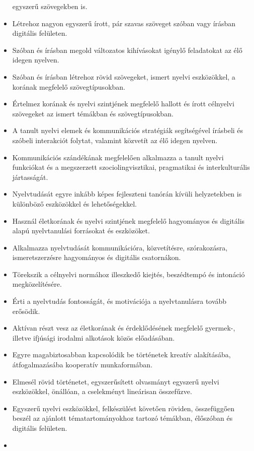 \begin{itemize}
  egyszerű szövegekben is.
\item
  Létrehoz nagyon egyszerű írott, pár szavas szöveget szóban vagy
  írásban digitális felületen.
\item
  Szóban és írásban megold változatos kihívásokat igénylő feladatokat az
  élő idegen nyelven.
\item
  Szóban és írásban létrehoz rövid szövegeket, ismert nyelvi
  eszközökkel, a korának megfelelő szövegtípusokban.
\item
  Értelmez korának és nyelvi szintjének megfelelő hallott és írott
  célnyelvi szövegeket az ismert témákban és szövegtípusokban.
\item
  A tanult nyelvi elemek és kommunikációs stratégiák segítségével
  írásbeli és szóbeli interakciót folytat, valamint közvetít az élő
  idegen nyelven.
\item
  Kommunikációs szándékának megfelelően alkalmazza a tanult nyelvi
  funkciókat és a megszerzett szociolingvisztikai, pragmatikai és
  interkulturális jártasságát.
\item
  Nyelvtudását egyre inkább képes fejleszteni tanórán kívüli
  helyzetekben is különböző eszközökkel és lehetőségekkel.
\item
  Használ életkorának és nyelvi szintjének megfelelő hagyományos és
  digitális alapú nyelvtanulási forrásokat és eszközöket.
\item
  Alkalmazza nyelvtudását kommunikációra, közvetítésre, szórakozásra,
  ismeretszerzésre hagyományos és digitális csatornákon.
\item
  Törekszik a célnyelvi normához illeszkedő kiejtés, beszédtempó és
  intonáció megközelítésére.
\item
  Érti a nyelvtudás fontosságát, és motivációja a nyelvtanulásra tovább
  erősödik.
\item
  Aktívan részt vesz az életkorának és érdeklődésének megfelelő
  gyermek-, illetve ifjúsági irodalmi alkotások közös előadásában.
\item
  Egyre magabiztosabban kapcsolódik be történetek kreatív alakításába,
  átfogalmazásába kooperatív munkaformában.
\item
  Elmesél rövid történetet, egyszerűsített olvasmányt egyszerű nyelvi
  eszközökkel, önállóan, a cselekményt lineárisan összefűzve.
\item
  Egyszerű nyelvi eszközökkel, felkészülést követően röviden,
  összefüggően beszél az ajánlott tématartományokhoz tartozó témákban,
  élőszóban és digitális felületen.
\item

\end{itemize}
